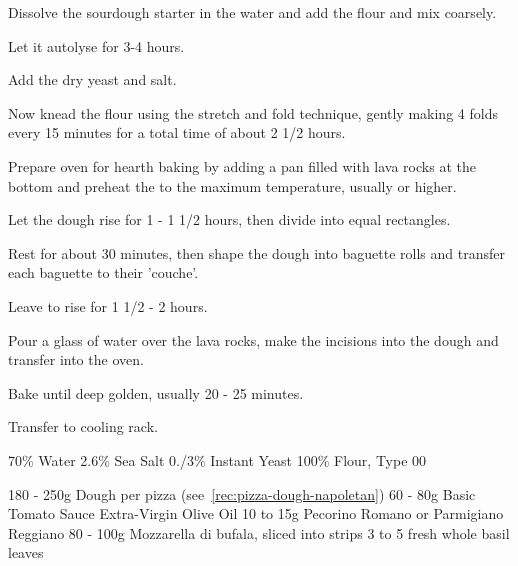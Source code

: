 \begin{method}
Dissolve the sourdough starter in the water and add the flour and mix coarsely.

Let it autolyse for 3-4 hours.

Add the dry yeast and salt.

Now knead the flour using the stretch and fold technique, gently making 4 folds  every 15 minutes for a total time of about 2 1/2 hours.

Prepare oven for hearth baking by adding a pan filled with lava rocks at the bottom and preheat the to the maximum temperature, usually  or higher.

Let the dough rise for 1 - 1 1/2 hours, then divide into equal rectangles.

Rest for about 30 minutes, then shape the dough into baguette rolls and transfer each baguette to their 'couche'.

Leave to rise for 1 1/2 - 2 hours.

Pour a glass of water over the lava rocks, make the incisions into the dough and transfer into the oven.

Bake until deep golden,  usually 20 - 25 minutes.

Transfer to cooling rack.

\end {method}

\label{rec:pizza-dough-napoletan}

\begin{ingreds}
	70\% Water
	2.6\% Sea Salt
	0./3\% Instant Yeast
	100\% Flour, Type 00
\end{ingreds}

\label{rec:pizza-margherita}

\begin{ingreds}
	180 - 250g Dough per pizza (see~\ref{rec:pizza-dough-napoletan})
	60 - 80g Basic Tomato Sauce
	Extra-Virgin Olive Oil 
	10 to 15g Pecorino Romano or Parmigiano Reggiano
	80 - 100g Mozzarella di bufala, sliced into strips
	3 to 5 fresh whole basil leaves
\end{ingreds}


